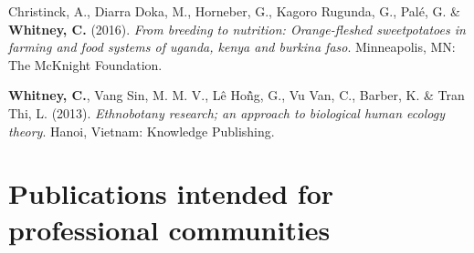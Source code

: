 \documentclass[11pt,a4paper,]{awesome-cv}
\newlength{\cslhangindent}
\newenvironment{CSLReferences}[2] %
 {\begin{list}{}{%
  \setlength{\itemindent}{0pt}
  \setlength{\leftmargin}{0pt}
  \setlength{\parsep}{0pt}
  \ifodd #1
   \setlength{\leftmargin}{\cslhangindent}
   \setlength{\itemindent}{-1\cslhangindent}
  \fi
  \setlength{\itemsep}{#2\baselineskip}}}
 {\end{list}}
\begin{document}
\begin{CSLReferences}{1}{0}
Christinck, A., Diarra Doka, M., Horneber, G., Kagoro Rugunda, G., Palé,
G. \& \textbf{Whitney, C.} (2016). \emph{From breeding to nutrition:
Orange-fleshed sweetpotatoes in farming and food systems of uganda,
kenya and burkina faso}. Minneapolis, MN: The McKnight Foundation.

\textbf{Whitney, C.}, Vang Sin, M. M. V., Lê Hoǹ̂g, G., Vu Van, C.,
Barber, K. \& Tran Thi, L. (2013). \emph{Ethnobotany research; an
approach to biological human ecology theory}. Hanoi, Vietnam: Knowledge
Publishing.

\end{CSLReferences}

\section{Publications intended for professional
communities}\label{publications-intended-for-professional-communities}
\end{document}
